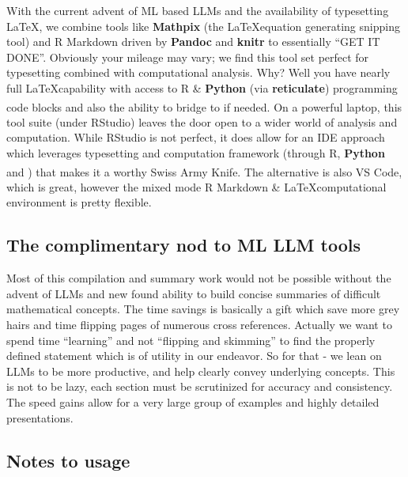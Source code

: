 \documentclass[
  12 pt,
  a4paper,
]{book}
\newcommand{\textpoppins}[1]{{\poppins #1}}
\newcommand{\textfluxreg}[1]{{\fluxreg #1}}
\newcommand{\textlato}[1]{{\lato #1}}
\newcommand{\textssp}[1]{{\ssp #1}}
\newcommand{\textcouriernew}[1]{{\couriernew #1}}
\newcommand{\textarial}[1]{{\arial #1}}
\newcommand{\textpalatino}[1]{{\palatino #1}}
\numberwithin{equation}{section}
\theoremstyle{plain}      %
\theoremstyle{definition} %
\theoremstyle{remark}     %
\theoremstyle{note}         %
\begin{document}
With the current advent of ML based LLMs and the availability of
typesetting \LaTeX , we combine tools like
\textbf{\large{\textpoppins{Mathpix}}} (the \LaTeX  equation generating
snipping tool) and \textcouriernew{R Markdown} driven by
\textbf{\large{\textarial{Pandoc}}} and
\textbf{\large{\textpalatino{knitr}}} to essentially ``GET IT DONE''.
Obviously your mileage may vary; we find this tool set perfect for
typesetting combined with computational analysis. Why? Well you have
nearly full \LaTeX  capability with access to R \&
\textbf{\large{\textfluxreg{Python}}} (via
\textbf{\large{\textlato{reticulate}}}) programming code blocks and also
the ability to bridge to
\text{\large{\textssp{MATHEMATICA}}}\textsuperscript{\textregistered} if
needed. On a powerful laptop, this tool suite (under RStudio) leaves the
door open to a wider world of analysis and computation. While RStudio is
not perfect, it does allow for an IDE approach which leverages
typesetting and computation framework (through R,
\textbf{\large{\textfluxreg{Python}}} and
\text{\large{\textssp{MATHEMATICA}}}\textsuperscript{\textregistered})
that makes it a worthy Swiss Army Knife. The alternative is also VS
Code, which is great, however the mixed mode \textcouriernew{R Markdown}
\& \LaTeX  computational environment is pretty flexible.

\hypertarget{the-complimentary-nod-to-ml-llm-tools}{%
\subsection*{The complimentary nod to ML LLM
tools}\label{the-complimentary-nod-to-ml-llm-tools}}

Most of this compilation and summary work would not be possible without
the advent of LLMs and new found ability to build concise summaries of
difficult mathematical concepts. The time savings is basically a gift
which save more grey hairs and time flipping pages of numerous cross
references. Actually we want to spend time ``learning'' and not
``flipping and skimming'' to find the properly defined statement which
is of utility in our endeavor. So for that - we lean on LLMs to be more
productive, and help clearly convey underlying concepts. This is not to
be lazy, each section must be scrutinized for accuracy and consistency.
The speed gains allow for a very large group of examples and highly
detailed presentations.

\hypertarget{notes-to-usage}{%
\subsection*{Notes to usage}\label{notes-to-usage}}
\end{document}
